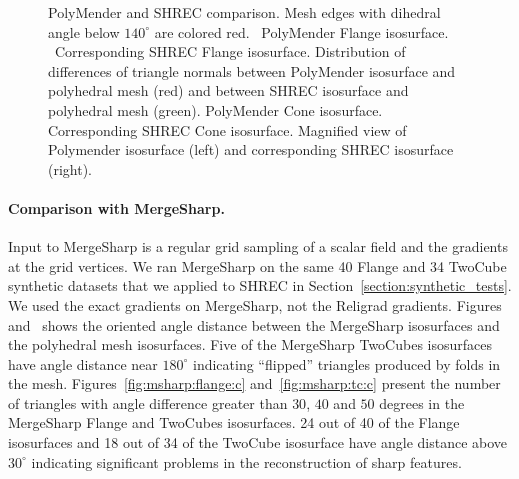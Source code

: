 \begin{figure}[t]
\caption{PolyMender and SHREC comparison.
Mesh edges with dihedral angle below $140^\circ$ are colored red.
\protect{}~PolyMender Flange isosurface.
\protect{}~Corresponding SHREC Flange isosurface.
\protect{} Distribution of differences of triangle normals
between PolyMender isosurface and polyhedral mesh (red)
and between SHREC isosurface and polyhedral mesh (green).
\protect{} PolyMender Cone isosurface.
\protect{} Corresponding SHREC Cone isosurface.
\protect{} Magnified view of Polymender isosurface (left)
and corresponding SHREC isosurface (right).
} 
\label{fig:polymenderB}
\end{figure}


\paragraph{Comparison with MergeSharp.}


Input to MergeSharp is a regular grid sampling of a scalar field
and the gradients at the grid vertices.
We ran MergeSharp on the same 40 Flange and 34 TwoCube synthetic datasets
that we applied to SHREC in Section~\ref{section:synthetic_tests}.
We used the exact gradients on MergeSharp, not the Religrad gradients.
Figures~ and~
shows the oriented angle distance between the MergeSharp isosurfaces 
and the polyhedral mesh isosurfaces.
Five of the MergeSharp TwoCubes isosurfaces have angle distance 
near $180^\circ$ indicating ``flipped'' triangles produced by folds
in the mesh.
Figures~\ref{fig:msharp:flange:c} and~\ref{fig:msharp:tc:c} 
present the number of triangles with angle difference greater
than $30$, $40$ and $50$ degrees 
in the MergeSharp Flange and TwoCubes isosurfaces.
24 out of 40 of the Flange isosurfaces and 18 out of 34 
of the TwoCube isosurface have angle distance above $30^\circ$
indicating significant problems in the reconstruction of sharp features.

